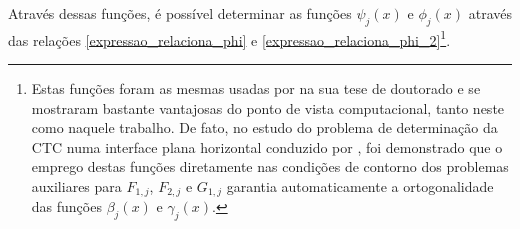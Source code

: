 Através dessas funções, é possível determinar as funções $\psi_j(x)$ e $\phi_j(x)$ através das relações \eqref{expressao_relaciona_phi} e \eqref{expressao_relaciona_phi_2}\footnote{Estas funções foram as mesmas usadas por \cite{tese_padilha} na sua tese de doutorado e se mostraram bastante vantajosas do ponto de vista computacional, tanto neste como naquele trabalho. De fato, no estudo do problema de determinação da CTC numa interface plana horizontal conduzido por \cite{tese_padilha}, foi demonstrado que o emprego destas funções diretamente nas condições de contorno dos problemas auxiliares para $F_{1,j}$, $F_{2,j}$ e $G_{1,j}$ garantia automaticamente a ortogonalidade das funções $\beta_j(x)$ e $\gamma_j(x)$.}.

%
%
%		
%		
%		
